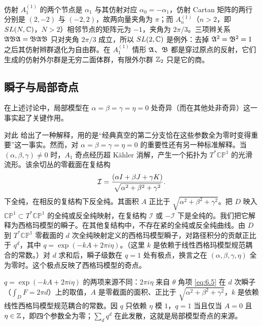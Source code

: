 \begin{yizhu}[易错点]仿射 $A_1^{(1)}$ 的两个节点是 $\alpha_1$ 与其仿射对应 $\alpha_0=-\alpha_1$，仿射 Cartan 矩阵的两行分别是 $(2,-2)$ 与 $(-2,2)$，故两向量夹角为 $\pi$；而 $A_n^{(1)}$（$n>2$，即 $SL(N,{\mathbb{C}})$，$N>2$）相邻节点的矩阵元为 $-1$，夹角为 $2\pi/3$。三项辫关系 $\mathfrak{A}\mathfrak{B}\mathfrak{A}=\mathfrak{B}\mathfrak{A}\mathfrak{B}$ 只对夹角 $2\pi/3$ 成立，所以 $SL(2,{\mathbb{C}})$ 是例外：去掉 $\mathfrak{A}^2=\mathfrak{B}^2=1$ 之后其仿射辫群退化为自由群。在 $A_1^{(1)}$ 情形 $\mathfrak{A}$、$\mathfrak{B}$ 都是穿过原点的反射，它们生成的仿射外尔群是无穷二面体群，有限外尔群 ${\mathbb{Z}}_2$ 只是它的商。\end{yizhu}


\subsection{瞬子与局部奇点}

\label{sec:6.3}

在上述讨论中，局部模型在 $\alpha=\beta=\gamma=\eta=0$ 处奇异（而在其他处非奇异）这一事实起了关键作用。

对此 \cite{ref81} 给出了一种解释，用的是“经典真空的第二分支恰在这些参数全为零时变得重要”这一事实。然而，对 $\alpha=\beta=\gamma=\eta=0$ 的重要性还有另一种标准解释。当 $(\alpha,\beta,\gamma)\not=0$ 时，$A_1$ 奇点经历超 Kähler 消解，产生一个拓扑为 $T^*\mathbb{CP}^1$ 的光滑流形。该余切丛的零截面在复结构
\setcounter{equation}{15}
\begin{equation}\label{eq:6.16}
  {\mathcal I}={(\alpha I+\beta J+\gamma K)\over
\sqrt{\alpha^2+\beta^2+\gamma^2}}.
\end{equation}
 下全纯，在相反的复结构下反全纯。其面积 $A$ 正比于 $\sqrt{\alpha^2+\beta^2+\gamma^2}$。把 $D$ 映入 $\mathbb{CP}^1\subset T^*\mathbb{CP}^1$ 的全纯或反全纯映射，在复结构 $\mathcal I$ 或 $-\mathcal I$ 下是全纯的。我们把它解释为西格玛模型的瞬子。在其他复结构中，不存在紧的全纯或反全纯曲线。由 $D$ 到 $T^*\mathbb{CP}^1$ 零截面的 $d$ 次全纯映射定义的西格玛模型瞬子，对路径积分的贡献正比于 $q^d$，其中 $q=\exp(- kA+2\pi i \eta)$。（这里 $k$ 是依赖于线性西格玛模型规范耦合的常数。）对 $d$ 求和后，瞬子级数在 $q=1$ 处有极点，换言之在 $(\alpha,\beta,\gamma,\eta)$ 全为零时。这个极点反映了西格玛模型的奇点。

\begin{yizhu}[易错点]$q=\exp(-kA+2\pi i\eta)$ 的两项来源不同：$2\pi i\eta$ 来自 $\theta$ 角项 \eqref{eq:6.5} 在 $d$ 次瞬子（$\int_DF=2\pi d$）上的取值，$A$ 是零截面的面积、正比于 $\sqrt{\alpha^2+\beta^2+\gamma^2}$，$k$ 是依赖线性西格玛模型规范耦合的常数。因 $q$ 只依赖 $\eta$ 模 $1$，$q=1$ 当且仅当 $A=0$ 且 $\eta\in{\mathbb{Z}}$，即四个参数全为零；$\sum_d q^d$ 在此发散，这就是局部模型奇点的来源。\end{yizhu}


